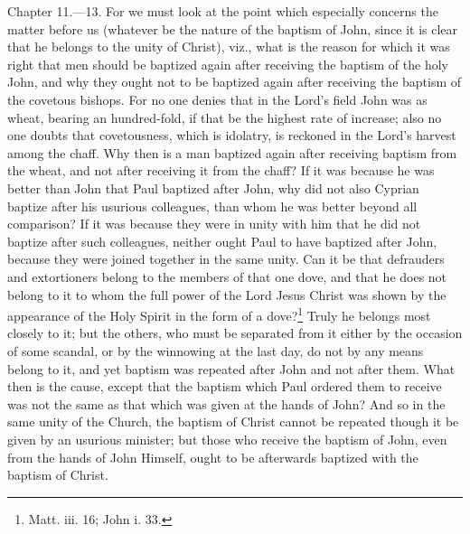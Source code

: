 Chapter 11.—13. For we must look at the point which especially concerns the matter before us (whatever be the nature of the baptism of John, since it is clear that he belongs to the unity of Christ), viz., what is the reason for which it was right that men should be baptized again after receiving the baptism of the holy John, and why they ought not to be baptized again after receiving the baptism of the covetous bishops. For no one denies that in the Lord’s field John was as wheat, bearing an hundred-fold, if that be the highest rate of increase; also no one doubts that covetousness, which is idolatry, is reckoned in the Lord’s harvest among the chaff. Why then is a man baptized again after receiving baptism from the wheat, and not after receiving it from the chaff? If it was because he was better than John that Paul baptized after John, why did not also Cyprian baptize after his usurious colleagues, than whom he was better beyond all comparison? If it was because they were in unity with him that he did not baptize after such colleagues, neither ought Paul to have baptized after John, because they were joined together in the same unity. Can it be that defrauders and extortioners belong to the members of that one dove, and that he does not belong to it to whom the full power of the Lord Jesus Christ was shown by the appearance of the Holy Spirit in the form of a dove?\footnote{\par  Matt. iii. 16; John i. 33.} Truly he belongs most closely to it; but the others, who must be separated from it either by the occasion of some scandal, or by the winnowing at the last day, do not by any means belong to it, and yet baptism was repeated after John and not after them. What then is the cause, except that the baptism which Paul ordered them to receive was not the same as that which was given at the hands of John? And so in the same unity of the Church, the baptism of Christ cannot be repeated though it be given by an usurious minister; but those who receive the baptism of John, even from the hands of John Himself, ought to be afterwards baptized with the baptism of Christ.


